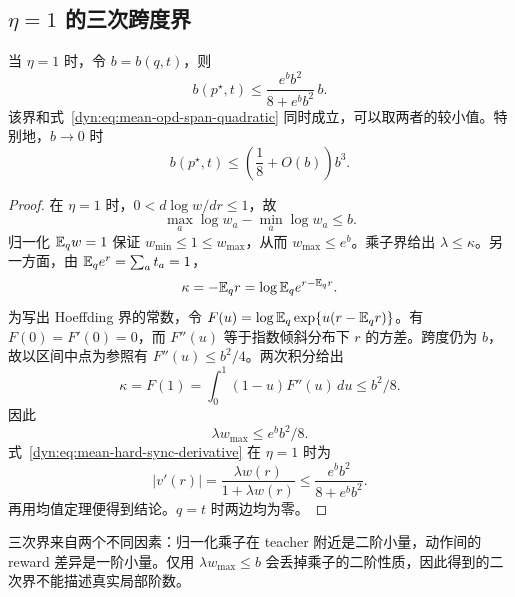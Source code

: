 \subsection{\texorpdfstring{$\eta=1$}{eta=1} 的三次跨度界}
\label{dyn:sec:mean-hard-sync-cubic-span}

\begin{proposition}
\label{dyn:prop:mean-hard-sync-cubic-span}
当 $\eta=1$ 时，令 $b=b(q,t)$，则
\begin{equation}
 b(p^\star,t)
 \le\frac{e^b b^2}{8+e^b b^2}\,b.
 \label{dyn:eq:mean-hard-sync-cubic-span}
\end{equation}
该界和式~\eqref{dyn:eq:mean-opd-span-quadratic} 同时成立，可以取两者的较小值。特别地，$b\to0$ 时
\begin{equation*}
 b(p^\star,t)\le\left(\frac18+O(b)\right)b^3.
\end{equation*}
\end{proposition}

\begin{proof}
在 $\eta=1$ 时，$0<d\log w/dr\le1$，故
\begin{equation*}
 \max_a\log w_a-\min_a\log w_a\le b.
\end{equation*}
归一化 $\mathbb E_qw=1$ 保证 $w_{\min}\le1\le w_{\max}$，从而 $w_{\max}\le e^b$。乘子界给出 $\lambda\le\kappa$。另一方面，由 $\mathbb E_qe^r=\sum_at_a=1$，
\begin{equation*}
 \kappa=-\mathbb E_qr
 =\log\mathbb E_qe^{r-\mathbb E_qr}.
\end{equation*}
为写出 Hoeffding 界的常数，令 $F(u)=\log\mathbb E_q\exp\{u(r-\mathbb E_qr)\}$。有 $F(0)=F'(0)=0$，而 $F''(u)$ 等于指数倾斜分布下 $r$ 的方差。跨度仍为 $b$，故以区间中点为参照有 $F''(u)\le b^2/4$。两次积分给出
\begin{equation*}
 \kappa=F(1)=\int_0^1(1-u)F''(u)\,du\le b^2/8.
\end{equation*}
因此
\begin{equation*}
 \lambda w_{\max}\le e^b b^2/8.
\end{equation*}
式~\eqref{dyn:eq:mean-hard-sync-derivative} 在 $\eta=1$ 时为
\begin{equation*}
 |v'(r)|=\frac{\lambda w(r)}{1+\lambda w(r)}
 \le\frac{e^b b^2}{8+e^b b^2}.
\end{equation*}
再用均值定理便得到结论。$q=t$ 时两边均为零。
\end{proof}

三次界来自两个不同因素：归一化乘子在 teacher 附近是二阶小量，动作间的 reward 差异是一阶小量。仅用 $\lambda w_{\max}\le b$ 会丢掉乘子的二阶性质，因此得到的二次界不能描述真实局部阶数。

